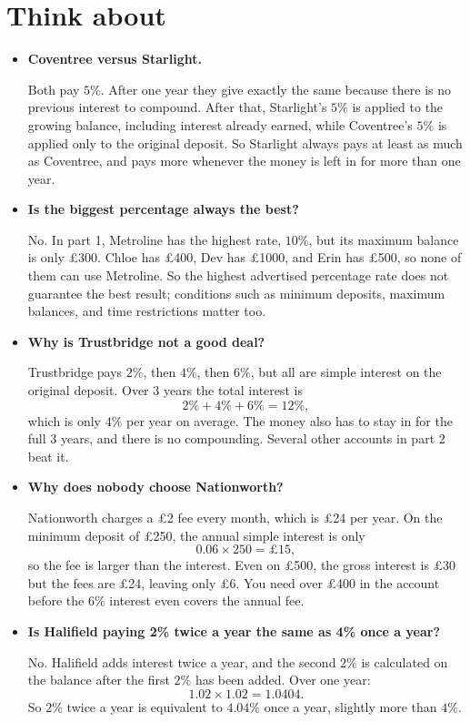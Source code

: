 \documentclass[12pt]{article}
\begin{document}
\section*{Think about}

\begin{itemize}[leftmargin=5mm, itemsep=3mm, topsep=1mm]

\item \textbf{Coventree versus Starlight.}

Both pay $5\%$. After one year they give exactly the same because there is no previous interest to compound. After that, Starlight's $5\%$ is applied to the growing balance, including interest already earned, while Coventree's $5\%$ is applied only to the original deposit. So Starlight always pays at least as much as Coventree, and pays more whenever the money is left in for more than one year.

\item \textbf{Is the biggest percentage always the best?}

No. In part 1, Metroline has the highest rate, $10\%$, but its maximum balance is only \pounds300. Chloe has \pounds400, Dev has \pounds1000, and Erin has \pounds500, so none of them can use Metroline. So the highest advertised percentage rate does not guarantee the best result; conditions such as minimum deposits, maximum balances, and time restrictions matter too.

\item \textbf{Why is Trustbridge not a good deal?}

Trustbridge pays $2\%$, then $4\%$, then $6\%$, but all are simple interest on the original deposit. Over 3 years the total interest is
\[
2\%+4\%+6\%=12\%,
\]
which is only $4\%$ per year on average. The money also has to stay in for the full 3 years, and there is no compounding. Several other accounts in part 2 beat it.

\item \textbf{Why does nobody choose Nationworth?}

Nationworth charges a \pounds2 fee every month, which is \pounds24 per year. On the minimum deposit of \pounds250, the annual simple interest is only
\[
0.06\times 250=\pounds15,
\]
so the fee is larger than the interest. Even on \pounds500, the gross interest is \pounds30 but the fees are \pounds24, leaving only \pounds6. You need over \pounds400 in the account before the $6\%$ interest even covers the annual fee.

\item \textbf{Is Halifield paying 2\% twice a year the same as 4\% once a year?}

No. Halifield adds interest twice a year, and the second $2\%$ is calculated on the balance after the first $2\%$ has been added. Over one year:
\[
1.02\times 1.02=1.0404.
\]
So $2\%$ twice a year is equivalent to $4.04\%$ once a year, slightly more than $4\%$.

\end{itemize}
\end{document}
